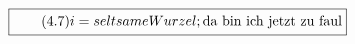 \documentclass[11pt]{article}
\newcommand{\1}{ {\mathds{1}} }
\begin{document}
		\begin{equation}
			\boxed{
				\tag{4.7}
				\begin{split}
					i = seltsame Wurzel; 
					\text{da bin ich jetzt zu faul}
				\end{split}
			}
		\end{equation}

%
%		
%
%
%
%
\end{document}
